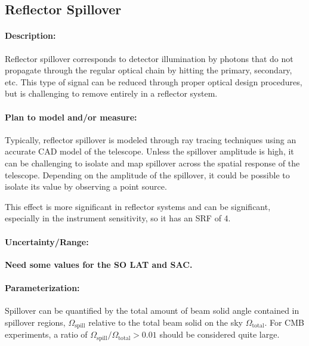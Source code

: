 \subsection{Reflector Spillover}

\paragraph{Description:}
Reflector spillover corresponds to detector illumination by photons that do not propagate through the regular optical chain by hitting the primary, secondary, etc. This type of signal can be reduced through proper optical design procedures, but is challenging to remove entirely in a reflector system.

\paragraph{Plan to model and/or measure:}
Typically, reflector spillover is modeled through ray tracing techniques using an accurate CAD model of the telescope. Unless the spillover amplitude is high, it can be challenging to isolate and map spillover across the spatial response of the telescope. Depending on the amplitude of the spillover, it could be possible to isolate its value by observing a point source.

This effect is more significant in reflector systems and can be significant, especially in the instrument sensitivity, so it has an SRF of 4.

\paragraph{Uncertainty/Range:}
\textbf{Need some values for the SO LAT and SAC.}
\paragraph{Parameterization:}
Spillover can be quantified by the total amount of beam solid angle contained in spillover regions, $\Omega _\mathrm{spill}$ relative to the total beam solid on the sky $\Omega _\mathrm{total}$. For CMB experiments, a ratio of $\Omega _\mathrm{spill} / \Omega _\mathrm{total} > 0.01$ should be considered quite large.
